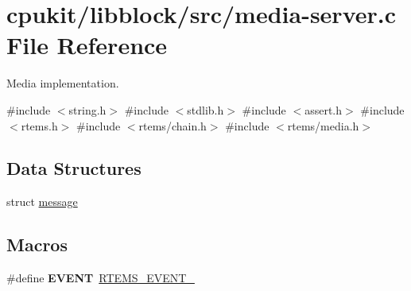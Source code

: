 \hypertarget{media-server_8c}{}\section{cpukit/libblock/src/media-\/server.c File Reference}
\label{media-server_8c}


Media implementation.  


{\ttfamily \#include $<$string.\+h$>$}\newline
{\ttfamily \#include $<$stdlib.\+h$>$}\newline
{\ttfamily \#include $<$assert.\+h$>$}\newline
{\ttfamily \#include $<$rtems.\+h$>$}\newline
{\ttfamily \#include $<$rtems/chain.\+h$>$}\newline
{\ttfamily \#include $<$rtems/media.\+h$>$}\newline
\subsection*{Data Structures}
\begin{DoxyCompactItemize}
\item 
struct \mbox{\hyperlink{structmessage}{message}}
\end{DoxyCompactItemize}
\subsection*{Macros}
\begin{DoxyCompactItemize}
\item 
\mbox{\label{media-server_8c_a7877e997621e1161f058fce90febd464}} 
\#define {\bfseries E\+V\+E\+NT}~\mbox{\hyperlink{group__ClassicEventSet_gadab2e575c5b836fcd51a2d50443fefea}{R\+T\+E\+M\+S\+\_\+\+E\+V\+E\+N\+T\+\_}}
\end{DoxyCompactItemize}
